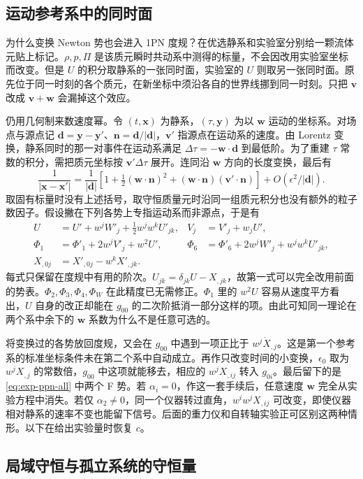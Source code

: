 \subsection{运动参考系中的同时面}

为什么变换 Newton 势也会进入 1PN 度规？在优选静系和实验室分别给一颗流体元贴上标记。$\rho,p,\Pi$ 是该质元瞬时共动系中测得的标量，不会因改用实验室坐标而改变。但是 $U$ 的积分取静系的一张同时面，实验室的 $U$ 则取另一张同时面。原先位于同一时刻的各个质元，在新坐标中须沿各自的世界线挪到同一时刻。只把 $\bm v$ 改成 $\bm v+\bm w$ 会漏掉这个效应。

仍用几何制来数速度幂。令 $(t,\bm x)$ 为静系，$(\tau,\bm y)$ 为以 $\bm w$ 运动的坐标系。对场点与源点记 $\bm d=\bm y-\bm y'$、$\bm n=\bm d/|\bm d|$，$\bm v'$ 指源点在运动系的速度。由 Lorentz 变换，静系同时的那一对事件在运动系满足 $\Delta\tau=-\bm w\cdot\bm d$ 到最低阶。为了重建 $\tau$ 常数的积分，需把质元坐标按 $\bm v'\Delta\tau$ 展开。连同沿 $\bm w$ 方向的长度变换，最后有
\[
 \frac{1}{|\bm x-\bm x'|}
 =\frac1{|\bm d|}\left[1+\tfrac12(\bm w\cdot\bm n)^2
              +(\bm w\cdot\bm n)(\bm v'\cdot\bm n)\right]
 +O(\epsilon^2/|\bm d|).
\]
取固有标量时没有上述括号，取守恒质量元时沿同一组质元积分也没有额外的粒子数因子。假设撇在下列各势上专指运动系而非源点，于是有
\begin{align*}
 U&=U'+w^jW'_j+\tfrac12w^jw^kU'_{jk},&
 V_j&=V'_j+w_jU',\\
 \Phi_1&=\Phi'_1+2w^jV'_j+w^2U',&
 \Phi_6&=\Phi'_6+2w^jW'_j+w^jw^kU'_{jk},\\
 X_{,0j}&=X'_{,0j}-w^kX'_{,jk}.&&
\end{align*}
每式只保留在度规中有用的阶次。$U_{jk}=\delta_{jk}U-X_{,jk}$，故第一式可以完全改用前面的势表。$\Phi_2,\Phi_3,\Phi_4,\Phi_W$ 在此精度已无需修正。$\Phi_1$ 里的 $w^2U$ 容易从速度平方看出，$U$ 自身的改正却能在 $g_{00}$ 的二次阶抵消一部分这样的项。由此可知同一理论在两个系中余下的 $\bm w$ 系数为什么不是任意可选的。

将变换过的各势放回度规，又会在 $g_{00}$ 中遇到一项正比于 $w^j\dot X_{,j}$。这是第一个参考系的标准坐标条件未在第二个系中自动成立。再作只改变时间的小变换，$\epsilon_0$ 取为 $w^jX_{,j}$ 的常数倍，$g_{00}$ 中这项就能移去，相应的 $w^jX_{,ij}$ 转入 $g_{0i}$。最后留下的是 \eqref{eq:exp-ppn-all} 中两个 F 势。若 $\alpha_i=0$，作这一套手续后，任意速度 $\bm w$ 完全从实验方程中消失。若仅 $\alpha_2\ne0$，同一个仪器转过直角，$w^iw^jX_{,ij}$ 可改变，即使仪器相对静系的速率不变也能留下信号。后面的重力仪和自转轴实验正可区别这两种情形。以下在给出实验量时恢复 $c$。

\subsection{局域守恒与孤立系统的守恒量}

